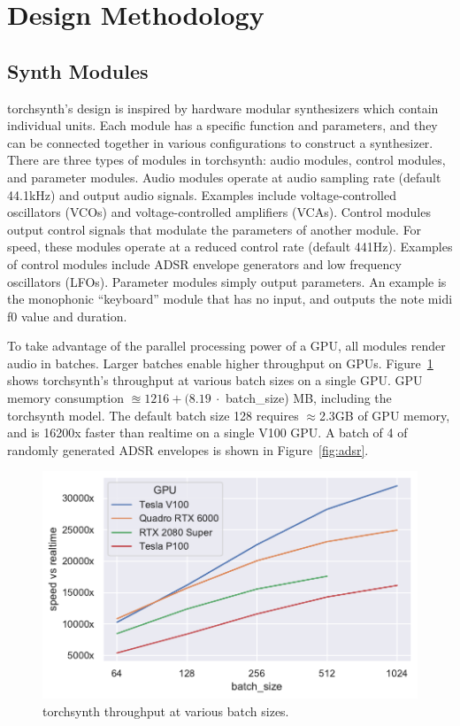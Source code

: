 \section{Design Methodology}
\label{sec:design-methodology}
\subsection{Synth Modules}
torchsynth's design is inspired by hardware modular synthesizers which contain individual units. Each module has a specific function and parameters, and they can be connected together in various configurations to construct a synthesizer. There are three types of modules in torchsynth: audio modules, control modules, and parameter modules. Audio modules operate at audio sampling rate (default 44.1kHz) and output audio signals. Examples include voltage-controlled oscillators (VCOs) and voltage-controlled amplifiers (VCAs). Control modules output control signals that modulate the parameters of another module. For speed, these modules operate at a reduced control rate (default 441Hz). Examples of control modules include ADSR envelope generators and low frequency oscillators (LFOs). Parameter modules simply output parameters. An example is the monophonic ``keyboard'' module that has no input, and outputs the note midi f0 value and duration.

To take advantage of the parallel processing power of a GPU, all modules render audio in batches. Larger batches enable higher throughput on GPUs.  Figure~\ref{fig:gpu-profiles} shows torchsynth's throughput at various batch sizes on a single GPU. GPU memory consumption $\approxeq 1216 + (8.19\ \cdot $ batch\_size) MB, including the torchsynth model. The default batch size 128 requires $\approx$2.3GB of GPU memory, and is 16200x faster than realtime on a single V100 GPU. %
A batch of 4 of randomly generated ADSR envelopes is shown in Figure~\ref{fig:adsr}.



\begin{figure}[t]
    \centering
    \includegraphics[width=0.66\linewidth]{gpu-profiles.pdf}
  \vspace{-1.5em}
    \caption{torchsynth throughput at various batch sizes.}
    \label{fig:gpu-profiles}
\end{figure}

